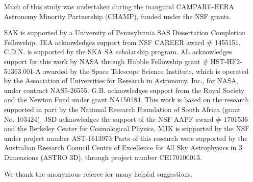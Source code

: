 \documentclass[twocolumn, trackchanges]{aastex61}
\begin{document}
Much of this study was undertaken during the inaugural CAMPARE-HERA Astronomy Minority Partnership (CHAMP), funded under the NSF grants.

SAK is supported by a University of Pennsylvania SAS Dissertation Completion Fellowship.
JEA acknowledges support from NSF CAREER award \# 1455151.
C.D.N. is supported by the SKA SA scholarship program.
AL acknowledges support for this work by NASA through Hubble Fellowship grant \# HST-HF2-51363.001-A awarded by the Space Telescope Science Institute, which is operated by the Association of Universities for Research in Astronomy, Inc., for NASA, under contract NAS5-26555.
G.B. acknowledges support from the Royal Society and the Newton Fund under grant NA150184. This work is based on the research supported in part by the National Research Foundation of South Africa (grant No. 103424).
JSD acknowledges the support of the NSF AAPF award \# 1701536 and the Berkeley Center for Cosmological Physics.
MJK is supported by the NSF under project number AST-1613973
Parts of this research were supported by the Australian Research
Council Centre of Excellence for All Sky Astrophysics in 3 Dimensions
(ASTRO 3D), through project number CE170100013.

We thank the anonymous referee for many helpful suggestions.


\clearpage



\end{document}
